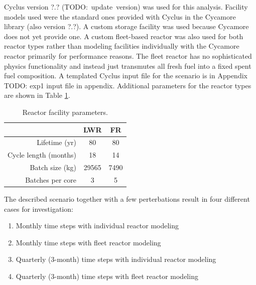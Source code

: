 \documentclass{style}
\begin{document}
Cyclus version ?.? (TODO:~update~version) was used for this analysis.
Facility models used were the standard ones provided with Cyclus in the
Cycamore library (also version ?.?).  A custom storage facility was used
because Cycamore does not yet provide one.  A custom fleet-based reactor was
also used for both reactor types rather than modeling facilities individually
with the Cycamore reactor primarily for performance reasons. The fleet reactor
has no sophisticated physics functionality and instead just transmutes all
fresh fuel into a fixed spent fuel composition.  A templated Cyclus input file
for the scenario is in Appendix TODO: exp1 input file in appendix. Additional
parameters for the reactor types are shown in Table \ref{tab:reactors}.

\vspace{2mm}

\begin{table}[h]
    \centering
    \begin{tabular}{ |r | c c | }
        \hline                       
            & LWR & FR \\
        \hline                       
        Lifetime (yr)         & 80 & 80 \\
        Cycle length (months) & 18 & 14 \\
        Batch size (kg)       & 29565 & 7490 \\
        Batches per core      & 3 & 5 \\
        \hline                       
    \end{tabular}
    \captionsetup{justification=centering}
    \caption[Reactor facility parameters]{Reactor facility parameters.}
    \label{tab:reactors}
\end{table}

The described scenario together with a few perterbations result in four
different cases for investigation:

\begin{enumerate}

    \item Monthly time steps with individual reactor modeling
    \item Monthly time steps with fleet reactor modeling
    \item Quarterly (3-month) time steps with individual reactor modeling
    \item Quarterly (3-month) time steps with fleet reactor modeling

\end{enumerate}
\end{document}
